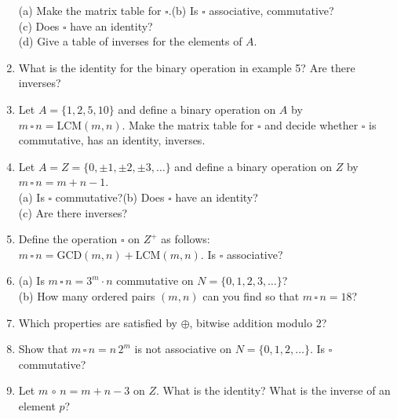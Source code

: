 \documentclass[12pt]{article}
\theoremstyle{definition}
\begin{document}
\begin{enumerate}
(a) Make the matrix table for $\square$.\qquad (b) Is $\square$ associative, commutative?\\
(c) Does $\square$ have an identity?\\
(d) Give a table of inverses for the elements of $A$.
\item What is the identity for the binary operation in example 5?  Are there inverses?
\item Let $A=\{1,2,5,10\}$ and define a binary operation on $A$ by $m\,\square\,n = \text{LCM}(m,n)$.  Make the matrix table for $\square$ and decide whether $\square$ is commutative, has an identity, inverses.
\item Let $A=Z=\{0,\pm1, \pm2,\pm3,\dots\}$ and define a binary operation on $Z$ by $m\,\square\,n=m+n-1$.\\
(a) Is $\square$ commutative?\qquad (b) Does $\square$ have an identity?\\
(c) Are there inverses?
\item Define the operation $\square$ on $Z^+$ as follows: $m\,\square\,n = \text{GCD}(m,n)+\text{LCM}(m,n)$.  Is $\square$ associative?
\item (a) Is $m\,\square\,n=3^m\cdot n$ commutative on $N=\{0,1,2,3,\dots\}$?\\
(b) How many ordered pairs $(m,n)$ can you find so that $m\,\square\,n = 18$?
\item Which properties are satisfied by $\oplus$, bitwise addition modulo 2?
\item Show that $m\,\square\,n = n\,2^m$ is not associative on $N=\{0,1,2,\dots\}$.  Is $\square$ commutative?
\item Let $m\,\circ\,n = m+n-3$ on $Z$.  What is the identity?  What is the inverse of an element $p$?
\end{enumerate}
\end{document}
